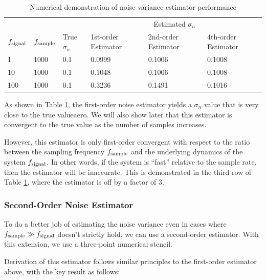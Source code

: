 \documentclass[conf]{new-aiaa}
\begin{document}
    \begin{table}[H]
        \centering
        \caption{Numerical demonstration of noise variance estimator performance}
        \label{tab:noise_variance_demo}
        \begin{tabular}{@{}lll|lll@{}}
            \toprule
            & & & \multicolumn{3}{c}{Estimated $\sigma_n$} \\
            $f_{\rm signal}$ & $f_{\rm sample}$ & True $\sigma_n$ & 1st-order Estimator & 2nd-order Estimator & 4th-order Estimator \\ \midrule
            1                & 1000             & 0.1             & 0.0999              & 0.1006              & 0.1008              \\
            10               & 1000             & 0.1             & 0.1048              & 0.1006              & 0.1008              \\
            100              & 1000             & 0.1             & 0.3236              & 0.1491              & 0.1016              \\ \bottomrule
        \end{tabular}
    \end{table}

    As shown in Table \ref{tab:noise_variance_demo}, the first-order noise estimator yields a $\sigma_n$ value that is very close to the true valueaero. We will also show later that this estimator is convergent to the true value as the number of samples increases.

    However, this estimator is only first-order convergent with respect to the ratio between the sampling frequency $f_{\rm sample}$ and the underlying dynamics of the system $f_{\rm signal}$. In other words, if the system is ``fast'' relative to the sample rate, then the estimator will be inaccurate. This is demonstrated in the third row of Table \ref{tab:noise_variance_demo}, where the estimator is off by a factor of 3.

    \subsubsection{Second-Order Noise Estimator}

    To do a better job of estimating the noise variance even in cases where $f_{\rm sample} \gg f_{\rm signal}$ doesn't strictly hold, we can use a second-order estimator. With this extension, we use a three-point numerical stencil.

    Derivation of this estimator follows similar principles to the first-order estimator above, with the key result as follows:
\end{document}
